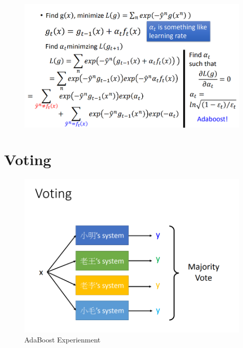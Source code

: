 \begin{figure}[H]
    \centerline{\includegraphics[scale=0.5]{Part1/Chapter/images/gb4.png}}
\end{figure}


\section{Voting}
\begin{figure}[H]
    \centerline{\includegraphics[scale=0.5]{Part1/Chapter/images/voting.png}}
    \caption{AdaBoost Experienment}
\end{figure}

